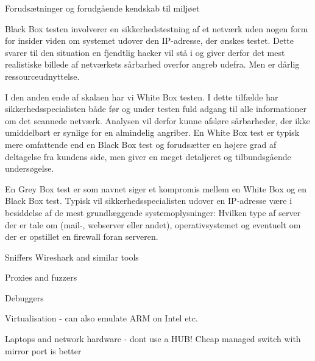 \documentclass[Screen16to9,17pt]{foils}
\begin{document}
\begin{list2}
\item Forudsætninger og forudgående kendskab til miljøet
\item Black Box testen involverer en sikkerhedstestning af et netværk uden
nogen form for insider viden om systemet udover den IP-adresse, der
ønskes testet. Dette svarer til den situation en fjendtlig hacker vil
stå i og giver derfor det mest realistiske billede af netværkets
sårbarhed overfor angreb udefra. Men er dårlig ressourceudnyttelse.
\item I den anden ende  af skalaen har vi White Box testen. I dette tilfælde
har sikkerhedsspecialisten både før og under testen fuld adgang til
alle informationer om det scannede netværk. Analysen vil derfor kunne
afsløre sårbarheder, der ikke umiddelbart er synlige for en almindelig
angriber. En White Box test er typisk mere omfattende end en Black Box
test og forudsætter en højere grad af deltagelse fra kundens side, men
giver en meget detaljeret og tilbundsgående undersøgelse.

\item En Grey Box test er som navnet siger et kompromis mellem en White Box
og en Black Box test. Typisk vil sikkerhedsspecialisten udover en
IP-adresse være i besiddelse af de mest grundlæggende
systemoplysninger: Hvilken type af server der er tale om (mail-,
webserver eller andet), operativsystemet og eventuelt om der er
opstillet en firewall foran serveren.
\end{list2}




\begin{list2}
\item Sniffers Wireshark and similar tools
\item Proxies and fuzzers
\item Debuggers
\item Virtualisation - can also emulate ARM on Intel etc.
\item Laptops and network hardware - dont use a HUB! Cheap managed switch with mirror port is better
\end{list2}



\slidenext{}
\end{document}

